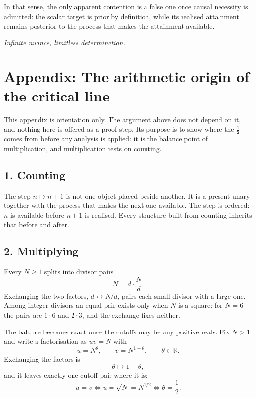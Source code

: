 \documentclass[11pt]{article}
\begin{document}
In that sense, the only apparent contention is a false one once causal necessity is admitted: the scalar target is prior by definition, while its realised attainment remains posterior to the process that makes the attainment available.

\begin{center}
\vspace{1.15em}
\emph{Infinite nuance, limitless determination.}
\end{center}

\clearpage
\section*{Appendix: The arithmetic origin of the critical line}

This appendix is orientation only. The argument above does not depend on it, and nothing here is offered as a proof step. Its purpose is to show where the \(\tfrac12\) comes from before any analysis is applied: it is the balance point of multiplication, and multiplication rests on counting.

\subsection*{1. Counting}

The step \(n\mapsto n+1\) is not one object placed beside another. It is a present unary together with the process that makes the next one available. The step is ordered: \(n\) is available before \(n+1\) is realised. Every structure built from counting inherits that before and after.

\subsection*{2. Multiplying}

Every \(N\ge1\) splits into divisor pairs
\[
N=d\cdot\frac Nd.
\]
Exchanging the two factors, \(d\leftrightarrow N/d\), pairs each small divisor with a large one. Among integer divisors an equal pair exists only when \(N\) is a square: for \(N=6\) the pairs are \(1\cdot6\) and \(2\cdot3\), and the exchange fixes neither.

The balance becomes exact once the cutoffs may be any positive reals. Fix \(N>1\) and write a factorisation as \(uv=N\) with
\[
u=N^\theta,
\qquad
v=N^{1-\theta},
\qquad
\theta\in\mathbb R.
\]
Exchanging the factors is
\[
\theta\longmapsto1-\theta,
\]
and it leaves exactly one cutoff pair where it is:
\[
u=v
\iff
u=\sqrt N=N^{1/2}
\iff
\theta=\frac12.
\]
\end{document}
